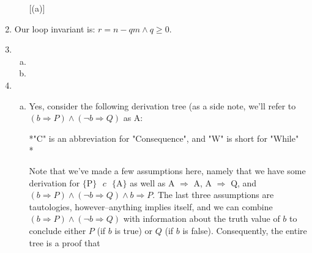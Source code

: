 \documentclass[10pt, oneside]{article}
\begin{document}
\begin{enumerate}[1.]
\begin{enumerate} [(a)]
  \end{enumerate}

  \item Our loop invariant is: $r = n - qm \wedge q \geq 0.$

  \item
  \begin{enumerate} [(a)]
    \item
    \item
  \end{enumerate}

  \item
  \begin{enumerate} [(a)]
    \item
      Yes, consider the following derivation tree (as a side note, we'll refer to 
  		$(b \Rightarrow P) \wedge (\neg b \Rightarrow Q)$ as A:
      
      \begin{prooftree}
        
        
      \end{prooftree}
      
      *"C" is an abbreviation for "Consequence", and "W" is short for "While" \\*
      
      Note that we've made a few assumptions here, namely that we have some 
      derivation for $\{\text{P}\} \text{ } c \text{ } \{\text{A}\}$ as well as 
      A $\Rightarrow$ A, A $\Rightarrow$ Q, and $(b \Rightarrow P) \wedge (\neg b 
      \Rightarrow Q) \wedge b \Rightarrow P$. The last three assumptions are 
      tautologies, however--anything implies itself, and we can combine $(b 
      \Rightarrow P) \wedge (\neg b \Rightarrow Q)$ with information about the
      truth value of $b$ to conclude either $P$ (if $b$ is true) or $Q$ (if $b$ 
      is false). Consequently, the entire tree is a proof that 
      

\end{enumerate}
\end{enumerate}
\end{document}
